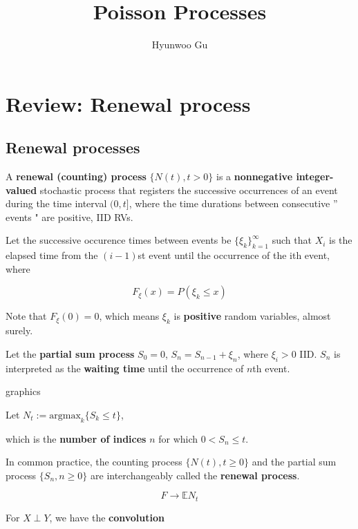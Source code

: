 \documentclass[12pt]{article}
\theoremstyle{nonumberbreak}
\begin{document}
\title{\textbf{Poisson Processes}}
\author{Hyunwoo Gu}
\date{}

\maketitle

\section*{Review: Renewal process}

\subsection*{Renewal processes}

A \textbf{renewal (counting) process} $\{N(t), t > 0\}$ is a \textbf{nonnegative integer-valued} stochastic process that registers the successive occurrences of an event during the time interval $(0, t]$, where the time durations between consecutive '' events " are positive, IID RVs. 

Let the successive occurence times between
events be $\{\xi_k\}_{k=1}^\infty$ such that $X_i$ is the elapsed time from the $(i-1)$st event until the occurrence of the ith event, where

$$
F_\xi (x) = P(\xi_k \le x)
$$

Note that $F_\xi(0) = 0$, which means $\xi_k$ is \textbf{positive} random variables, almost surely. 

Let the \textbf{partial sum process} $S_0 = 0$, $S_n = S_{n-1} + \xi_n$, where $\xi_i >0$ IID. $S_n$ is interpreted as the \textbf{waiting time} until the occurrence of $n$th event. 

 
graphics


Let $N_t := \mathrm{argmax}_k \{S_k \le t\}$, 

which is the \textbf{number of indices} $n$ for which $0 < S_n \le t$. 

In common practice, the counting process $\{N(t), t \ge 0 \}$ and the partial sum process $\{ S_n, n \ge 0 \}$ are interchangeably called the \textbf{renewal process}. 



$$
F \to \mathbb{E} N_t
$$

For $X \perp Y$, we have the \textbf{convolution}
\end{document}
